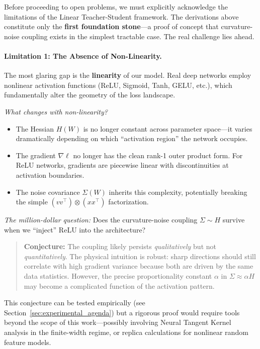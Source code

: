 \documentclass[
  journal=largetwo,
  simfonts=false,
  year=2025,
  volume=37,
]{cup-journal}
\begin{document}
Before proceeding to open problems, we must explicitly acknowledge the limitations of the Linear Teacher-Student framework. The derivations above constitute only the \textbf{first foundation stone}---a proof of concept that curvature-noise coupling exists in the simplest tractable case. The real challenge lies ahead.

\paragraph{Limitation 1: The Absence of Non-Linearity.}

The most glaring gap is the \textbf{linearity} of our model. Real deep networks employ nonlinear activation functions (ReLU, Sigmoid, Tanh, GELU, etc.), which fundamentally alter the geometry of the loss landscape.

\textit{What changes with non-linearity?}
\begin{itemize}
    \item The Hessian $H(W)$ is no longer constant across parameter space---it varies dramatically depending on which ``activation region'' the network occupies.
    \item The gradient $\nabla \ell$ no longer has the clean rank-1 outer product form. For ReLU networks, gradients are piecewise linear with discontinuities at activation boundaries.
    \item The noise covariance $\Sigma(W)$ inherits this complexity, potentially breaking the simple $(v v^\top) \otimes (x x^\top)$ factorization.
\end{itemize}

\textit{The million-dollar question:} Does the curvature-noise coupling $\Sigma \sim H$ survive when we ``inject'' ReLU into the architecture?

\begin{quote}
\textbf{Conjecture:} The coupling likely persists \textit{qualitatively} but not \textit{quantitatively}. The physical intuition is robust: sharp directions should still correlate with high gradient variance because both are driven by the same data statistics. However, the precise proportionality constant $\alpha$ in $\Sigma \approx \alpha H$ may become a complicated function of the activation pattern.
\end{quote}

This conjecture can be tested empirically (see Section~\ref{sec:experimental_agenda}) but a rigorous proof would require tools beyond the scope of this work---possibly involving Neural Tangent Kernel analysis in the finite-width regime, or replica calculations for nonlinear random feature models.
\end{document}
